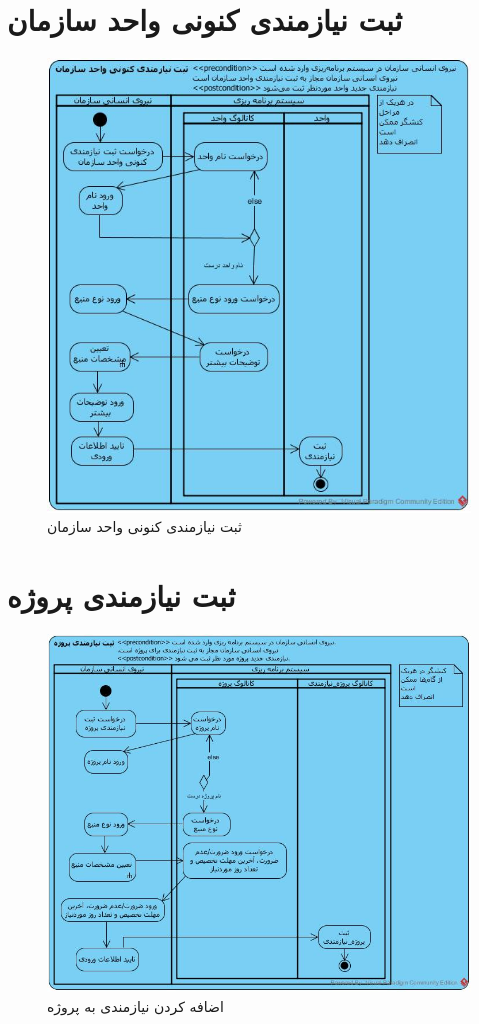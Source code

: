 \section{ثبت نیازمندی کنونی واحد سازمان}
\begin{figure}[H]
	\centering
	\includegraphics[scale=0.7]{img/activity/AddRequirementToUnit}
	\caption{ثبت نیازمندی کنونی واحد سازمان}
\end{figure}


\section{ثبت نیازمندی پروژه}
\begin{figure}[H]
	\centering
	\includegraphics[scale=0.65]{img/activity/AddRequirementToProject}
	\caption{اضافه کردن نیازمندی به پروژه}
\end{figure}

